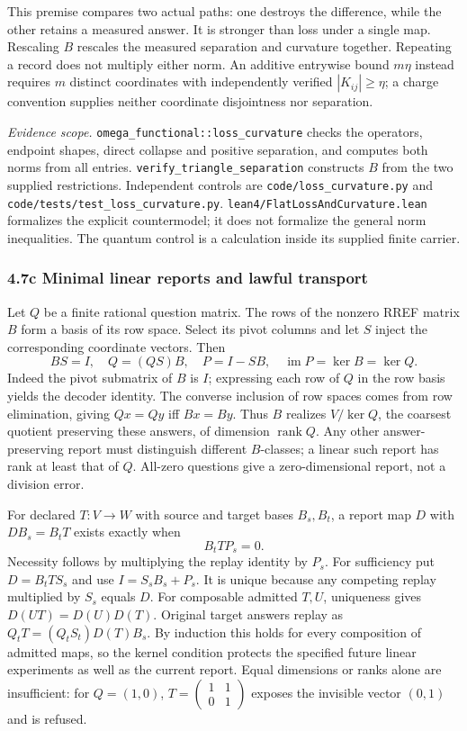 \documentclass[
  english,
  10pt,
  a4paper,
]{article}
\begin{document}
This premise compares two actual paths: one destroys the difference,
while the other retains a measured answer. It is stronger than loss
under a single map. Rescaling \(B\) rescales the measured separation and
curvature together. Repeating a record does not multiply either norm. An
additive entrywise bound \(m\eta\) instead requires \(m\) distinct
coordinates with independently verified \(|K_{ij}|\ge\eta\); a charge
convention supplies neither coordinate disjointness nor separation.

\emph{Evidence scope.} \nolinkurl{omega_functional::loss_curvature}
checks the operators, endpoint shapes, direct collapse and positive
separation, and computes both norms from all entries.
\nolinkurl{verify_triangle_separation} constructs \(B\) from the two
supplied restrictions. Independent controls are
\texttt{code/loss\_curvature.py} and
\nolinkurl{code/tests/test_loss_curvature.py}.
\nolinkurl{lean4/FlatLossAndCurvature.lean} formalizes the explicit
countermodel; it does not formalize the general norm inequalities. The
quantum control is a calculation inside its supplied finite carrier.

\subsubsection{4.7c Minimal linear reports and lawful
transport}\label{c-minimal-linear-reports-and-lawful-transport}

Let \(Q\) be a finite rational question matrix. The rows of the nonzero
RREF matrix \(B\) form a basis of its row space. Select its pivot
columns and let \(S\) inject the corresponding coordinate vectors. Then
\[
BS=I,\quad Q=(QS)B,\quad P=I-SB,\quad \operatorname{im}P=\ker B=\ker Q.
\] Indeed the pivot submatrix of \(B\) is \(I\); expressing each row of
\(Q\) in the row basis yields the decoder identity. The converse
inclusion of row spaces comes from row elimination, giving \(Qx=Qy\) iff
\(Bx=By\). Thus \(B\) realizes \(V/\ker Q\), the coarsest quotient
preserving these answers, of dimension \(\operatorname{rank}Q\). Any
other answer-preserving report must distinguish different \(B\)-classes;
a linear such report has rank at least that of \(Q\). All-zero questions
give a zero-dimensional report, not a division error.

For declared \(T:V\to W\) with source and target bases \(B_s,B_t\), a
report map \(D\) with \(DB_s=B_tT\) exists exactly when \[
B_tTP_s=0.
\] Necessity follows by multiplying the replay identity by \(P_s\). For
sufficiency put \(D=B_tTS_s\) and use \(I=S_sB_s+P_s\). It is unique
because any competing replay multiplied by \(S_s\) equals \(D\). For
composable admitted \(T,U\), uniqueness gives \(D(UT)=D(U)D(T)\).
Original target answers replay as \(Q_tT=(Q_tS_t)D(T)B_s\). By induction
this holds for every composition of admitted maps, so the kernel
condition protects the specified future linear experiments as well as
the current report. Equal dimensions or ranks alone are insufficient:
for \(Q=(1,0)\),
\(T=\left(\begin{smallmatrix}1&1\\0&1\end{smallmatrix}\right)\) exposes
the invisible vector \((0,1)\) and is refused.
\end{document}
